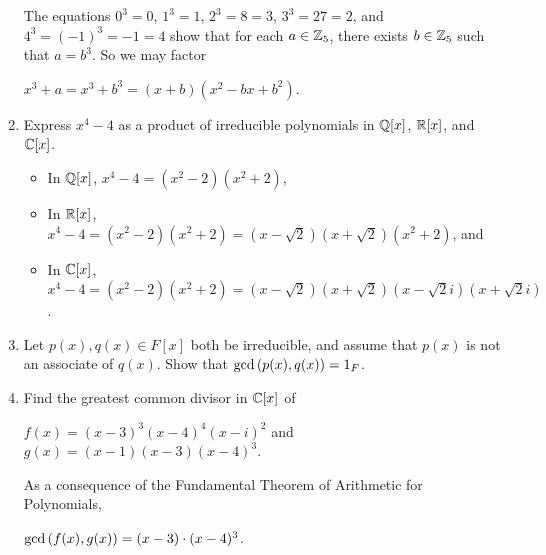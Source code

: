 \documentclass[11pt,fleqn,dvipsnames,usenames]{article}
\begin{document}
\begin{enumerate}
\solution The equations $0^3 = 0$, $1^3 = 1$, $2^3 = 8 = 3$, $3^3 = 27 = 2$, and $4^3 = (-1)^3 = -1 = 4$ show that for each $a\in\mathbb{Z}_{5}$, there exists $b\in\mathbb{Z}_{5}$ such that $a = b^3$.  So we may factor
\begin{center}
$x^3 + a = x^3 + b^3 = (x + b)(x^2 - bx + b^2)$.
\end{center}

\item Express $x^4 - 4$ as a product of irreducible polynomials in $\mathbb{Q}[x]$, $\mathbb{R}[x]$, and $\mathbb{C}[x]$.
\vsmsp

\solution
\begin{itemize}[\ ]
\item In $\mathbb{Q}[x]$, $x^4 - 4 = (x^2 - 2)(x^2 + 2)$,
\item In $\mathbb{R}[x]$, $x^4 - 4 = (x^2 - 2)(x^2 + 2) = (x - \sqrt{2})(x + \sqrt{2})(x^2 + 2)$, and
\item In $\mathbb{C}[x]$, $x^4 - 4 = (x^2 - 2)(x^2 + 2) = (x - \sqrt{2})(x + \sqrt{2})(x - \sqrt{2}i)(x + \sqrt{2}i)$.
\end{itemize}

\item Let $p(x),q(x)\in F[x]$ both be irreducible, and assume that $p(x)$ is not an associate of $q(x)$.  Show that $\text{gcd}\left(p(x),q(x)\right) = 1_{F}$.

\item Find the greatest common divisor in $\mathbb{C}[x]$ of
\begin{center}
$f(x) = (x-3)^3(x-4)^4(x-i)^2$ and $g(x) = (x-1)(x-3)(x-4)^3$.
\end{center}
\vsmsp

\solution As a consequence of the Fundamental Theorem of Arithmetic for Polynomials,
\begin{center}
$\text{gcd}\left(f(x),g(x)\right) = (x-3)\cdot(x-4)^3$.
\end{center}

\end{enumerate}
\end{document}
